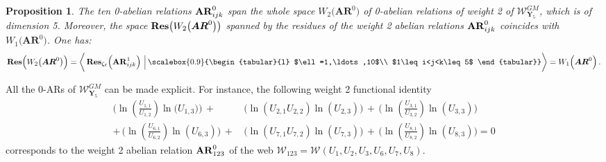 \documentclass[11pt]{amsart}
\newcommand{\bk}{\bigskip}
\newtheorem{prop}[thm]{Proposition}
\begin{document}
\begin{prop}
 The ten 0-abelian relations ${\bf AR}^0_{ijk}$ span  the whole space 
$W_2\big( \boldsymbol{AR}^0\big)$ 
of  0-abelian relations of weight 2 of  $\boldsymbol{\mathcal W}_{\boldsymbol{Y}_5}^{GM}$, which is of dimension 5.   
Moreover, the space ${\bf Res}\big( W_2\big( \boldsymbol{AR}^0\big)\big)$ spanned 
by the residues of the  weight 2 abelian relations ${\bf AR}^0_{ijk}$ coincides with 
$W_1\big( \boldsymbol{AR}^0\big)$. One has:
$$
 {\bf Res}\Big( W_2\big( \boldsymbol{AR}^0\big)\Big)
 =\bigg\langle\,
{\bf Res}_{\zeta_\ell} \Big( {\bf AR}^1_{ijk}
\Big) \,\, \Big\lvert  \,
\scalebox{0.9}{\begin{tabular}{l}
$\ell=1,\ldots,10$\\
$1\leq i<j<k\leq 5$
\end{tabular}}
 \bigg\rangle = W_1\Big( \boldsymbol{AR}^0\Big)\, .
$$


\end{prop}
All the 0-ARs of $\boldsymbol{\mathcal W}_{\boldsymbol{Y}_5}^{GM}$ can be made explicit.  For instance,  the following weight 2 functional identity 
\begin{align*}
\Bigg(
\ln  \left(\frac{U_{1,1}}{U_{1,2}}\right) \ln  \big(U_{1,3}\big)\Bigg) 
\,+\,&
\Bigg(  
\ln  \left({U_{2,1}}U_{2,2}\right) \ln  \left(U_{2,3}\right)
\Bigg)
\,+\,\bigg( 
\ln  \left(\frac{U_{3,1}}{U_{3,2}}\right) \ln  \left(U_{3,3}\right)
\bigg)  \\
+\,\Bigg( 
\ln  \left(\frac{U_{6,1}}{U_{6,2}}\right) \ln  \left(U_{6,3}\right)
 \Bigg)
\,+\,&\Bigg( 
\ln  \left(U_{7,1}U_{7,2}\right) \ln  \left(U_{7,3}\right)
\Bigg)
\,+\,\Bigg(
\ln  \left(\frac{U_{8,1}}{U_{8,2}}\right) \ln  \left(U_{8,3}\right)
\Bigg) =0
\end{align*}
corresponds to the weight 2 abelian relation ${\bf AR}^0_{123}$ of the web 
$\boldsymbol{\mathcal W}_{123}=\boldsymbol{\mathcal W}(U_1,U_2,U_3,U_6,U_7,U_8)$.
\end{document}
